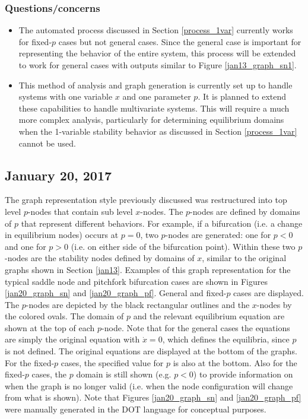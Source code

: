 \documentclass[12pt]{article}
\begin{document}
\subsubsection{Questions/concerns}
\begin{itemize}
	\item The automated process discussed in Section \ref{process_1var} currently works for fixed-$p$ cases but not general cases. Since the general case is important for representing the behavior of the entire system, this process will be extended to work for general cases with outputs similar to Figure \ref{jan13_graph_sn1}.
	\item This method of analysis and graph generation is currently set up to handle systems with one variable $x$ and one parameter $p$. It is planned to extend these capabilities to handle multivariate systems. This will require a much more complex analysis, particularly for determining equilibrium domains when the 1-variable stability behavior as discussed in Section \ref{process_1var} cannot be used.
\end{itemize}


\subsection{January 20, 2017}
\label{jan20}
The graph representation style previously discussed was restructured into top level $p$-nodes that contain sub level $x$-nodes. The $p$-nodes are defined by domains of $p$ that represent different behaviors. For example, if a bifurcation (i.e. a change in equilibrium nodes) occurs at $p=0$, two $p$-nodes are generated: one for $p<0$ and one for $p>0$ (i.e. on either side of the bifurcation point). Within these two $p$-nodes are the stability nodes defined by domains of $x$, similar to the original graphs shown in Section \ref{jan13}. Examples of this graph representation for the typical saddle node and pitchfork bifurcation cases are shown in Figures \ref{jan20_graph_sn} and \ref{jan20_graph_pf}. General and fixed-$p$ cases are displayed. The $p$-nodes are depicted by the black rectangular outlines and the $x$-nodes by the colored ovals. The domain of $p$ and the relevant equilibrium equation are shown at the top of each $p$-node. Note that for the general cases the equations are simply the original equation with $\dot{x}=0$, which defines the equilibria, since $p$ is not defined. The original equations are displayed at the bottom of the graphs. For the fixed-$p$ cases, the specified value for $p$ is also at the bottom. Also for the fixed-$p$ cases, the $p$ domain is still shown (e.g. $p<0$) to provide information on when the graph is no longer valid (i.e. when the node configuration will change from what is shown). Note that Figures \ref{jan20_graph_sn} and \ref{jan20_graph_pf} were manually generated in the DOT language for conceptual purposes. 
\end{document}
